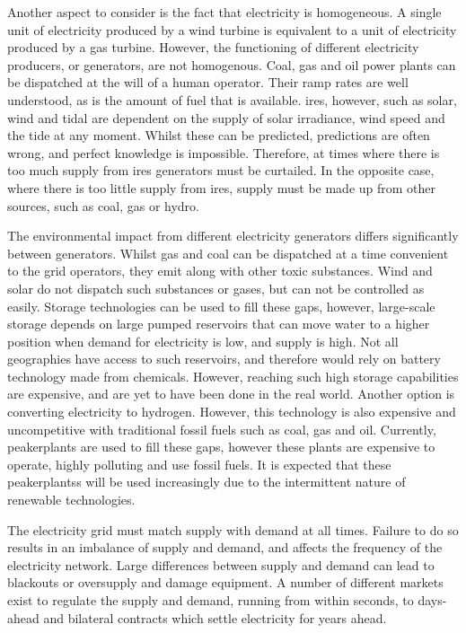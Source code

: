 Another aspect to consider is the fact that electricity is homogeneous. A single unit of electricity produced by a wind turbine is equivalent to a unit of electricity produced by a gas turbine. However, the functioning of different electricity producers, or generators, are not homogenous. Coal, gas and oil power plants can be \gls{dispatched} at the will of a human operator. Their ramp rates are well understood, as is the amount of fuel that is available. \Gls{ires}, however, such as solar, wind and tidal are dependent on the supply of solar irradiance, wind speed and the tide at any moment. Whilst these can be predicted, predictions are often wrong, and perfect knowledge is impossible. Therefore, at times where there is too much supply from \acrfull{ires} generators must be curtailed. In the opposite case, where there is too little supply from \acrshort{ires}, supply must be made up from other sources, such as coal, gas or hydro.

The environmental impact from different electricity generators differs significantly between generators. Whilst gas and coal can be dispatched at a time convenient to the grid operators, they emit  along with other toxic substances. Wind and solar do not dispatch such substances or gases, but can not be controlled as easily. Storage technologies can be used to fill these gaps, however, large-scale storage depends on large pumped reservoirs that can move water to a higher position when demand for electricity is low, and supply is high. Not all geographies have access to such reservoirs, and therefore would rely on battery technology made from chemicals. However, reaching such high storage capabilities are expensive, and are yet to have been done in the real world. Another option is converting electricity to hydrogen. However, this technology is also expensive and uncompetitive with traditional fossil fuels such as coal, gas and oil. Currently, \gls{peakerplants} are used to fill these gaps, however these plants are expensive to operate, highly polluting and use fossil fuels. It is expected that these \gls{peakerplants}s will be used increasingly due to the intermittent nature of renewable technologies. 


The electricity grid must match supply with demand at all times. Failure to do so results in an imbalance of supply and demand, and affects the frequency of the electricity network. Large differences between supply and demand can lead to blackouts or oversupply and damage equipment. A number of different markets exist to regulate the supply and demand, running from within seconds, to days-ahead and bilateral contracts which settle electricity for years ahead.

